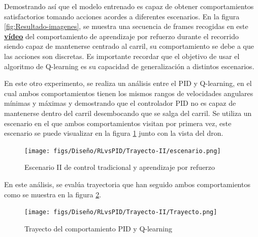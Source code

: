 Demostrando así que el modelo entrenado es capaz de obtener comportamientos satisfactorios tomando acciones acordes a diferentes escenarios. En la figura \ref{fig:Resultado-imagenes}, 
se muestra una secuencia de frames recogidas en este \href{https://youtu.be/rENEqUVqvVs?si=RTOyE4iCgt7TEdFk}{\textbf{vídeo}}
del comportamiento de aprendizaje por refuerzo durante el recorrido siendo capaz de mantenerse centrado al carril, su comportamiento se debe a que las acciones son discretas. 
Es importante recordar 
que el objetivo de usar el algoritmo de Q-learning es su capacidad de generalización a distintos escenarios. 

En este otro experimento, se realiza un análisis entre el PID y Q-learning, en el cual ambos comportamientos tienen los mismos rangos de velocidades angulares mínimas y máximas y demostrando que
el controlador PID no es capaz de mantenerse dentro del carril desembocando que se salga 
del carril. Se utiliza un escenario en el que ambos comportamientos visitan por primera vez, este escenario se puede visualizar en la figura \ref{fig:escenario-comparativa-II} junto 
con la vista del dron.

\begin{figure} [H]
  \begin{center}
    \texttt{[image: figs/Diseño/RLvsPID/Trayecto-II/escenario.png]}
  \end{center}
  \caption{Escenario II de control tradicional y aprendizaje por refuerzo}
  \label{fig:escenario-comparativa-II}
  \vspace{-1.5em}
\end{figure}

En este análisis, se evalúa trayectoria que han seguido ambos comportamientos como se muestra en la figura \ref{fig:Trayecto-II}. 

\begin{figure} [H]
  \begin{center}
    \texttt{[image: figs/Diseño/RLvsPID/Trayecto-II/Trayecto.png]}
  \end{center}
  \caption{Trayecto del comportamiento PID y Q-learning}
  \label{fig:Trayecto-II}
  \vspace{-1.5em}
\end{figure}

